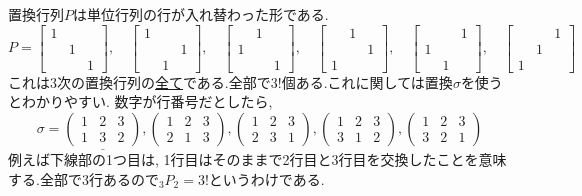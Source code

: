 置換行列$P$は単位行列の行が入れ替わった形である.
\[
P = \begin{bmatrix}
    1 & & \\
    & 1 & \\
    & & 1
    \end{bmatrix},\quad
\begin{bmatrix}
    1 & & \\
    & & 1 \\
    & 1 & 
\end{bmatrix},\quad
\begin{bmatrix}
    & 1 & \\
    1 & & \\
    & & 1 
\end{bmatrix},\quad
\begin{bmatrix}
     & 1 & \\
    &  & 1 \\
    1 & & 
\end{bmatrix},\quad
\begin{bmatrix}
     &  & 1\\
    1 & &  \\
     & 1 & 
\end{bmatrix},\quad
\begin{bmatrix}
     & & 1\\
     & 1 & \\
    1& &  
\end{bmatrix}
\]
これは3次の置換行列の\underline{全て}である.全部で$3!$個ある.これに関しては置換$\sigma$を使うとわかりやすい.
数字が行番号だとしたら,
\[
    \sigma = \underline{\begin{pmatrix}
        1 & 2 & 3\\ 
        1 & 3 & 2
    \end{pmatrix}},
    \begin{pmatrix}
        1 & 2 & 3\\ 
        2 & 1 & 3
    \end{pmatrix},
    \begin{pmatrix}
        1 & 2 & 3\\ 
        2 & 3 & 1
    \end{pmatrix},
    \begin{pmatrix}
        1 & 2 & 3\\ 
        3 & 1 & 2
    \end{pmatrix},
    \begin{pmatrix}
        1 & 2 & 3\\ 
        3 & 2 & 1
    \end{pmatrix}
\]
例えば下線部の1つ目は,
1行目はそのままで2行目と3行目を交換したことを意味する.全部で3行あるので${}_3P_2=3!$というわけである.

